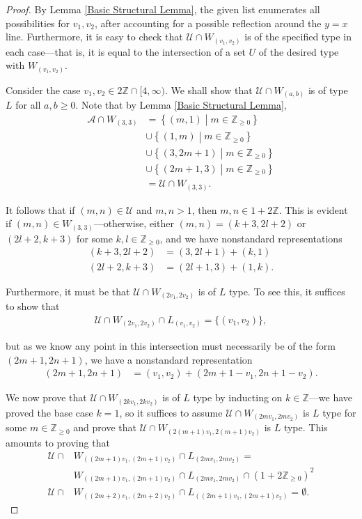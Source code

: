 \documentclass{amsart}
\newcommand{\ZZ}{\mathbb{Z}}
\newcommand{\U}{\mathcal{U}}
\newcommand{\A}{\mathcal{A}}
\theoremstyle{theorem}
\theoremstyle{definition}
\begin{document}
\begin{proof}
By Lemma \ref{Basic Structural Lemma}, the given list enumerates all possibilities for $v_1, v_2$, after accounting for a possible reflection around the $y = x$ line. Furthermore, it is easy to check that $\U \cap W_{(v_1, v_2)}$ is of the specified type in each case---that is, it is equal to the intersection of a set $U$ of the desired type with $W_{(v_1, v_2)}$.

Consider the case $v_1, v_2 \in 2\ZZ \cap [4,\infty)$. We shall show that $\U \cap W_{(a, b)}$ is of type $L$ for all $a,b \geq 0$. Note that by Lemma \ref{Basic Structural Lemma},
\begin{align*}
\A \cap W_{(3, 3)} &= \left\{(m,1) \middle| m \in \ZZ_{\geq 0}\right\} \\
&\cup \left\{(1,m) \middle| m \in \ZZ_{\geq 0}\right\} \\
&\cup \left\{(3,2m + 1) \middle| m \in \ZZ_{\geq 0} \right\} \\
&\cup \left\{(2m + 1,3) \middle| m \in \ZZ_{\geq 0} \right\} \\ &= \U \cap W_{(3, 3)}.
\end{align*}

\noindent It follows that if $(m,n) \in \U$ and $m, n > 1$, then $m, n \in 1 + 2\ZZ$. This is evident if $(m,n) \in W_{(3, 3)}$---otherwise, either $(m,n) = (k + 3, 2l + 2)$ or $(2l + 2, k + 3)$ for some $k, l \in \ZZ_{\geq 0}$, and we have nonstandard representations
	\begin{align*}
   (k + 3, 2l + 2) &= (3, 2l + 1) + (k, 1) \\
   (2l + 2, k + 3) &= (2l + 1, 3) + (1,k).
    \end{align*}
    
\noindent Furthermore, it must be that $\U \cap W_{(2v_1, 2v_2)}$ is of $L$ type. To see this, it suffices to show that
	\begin{align*}
    \U \cap W_{(2v_1, 2v_2)} \cap L_{(v_1, v_2)} = \{(v_1, v_2)\},
    \end{align*}
    
\noindent but as we know any point in this intersection must necessarily be of the form $(2m + 1, 2n + 1)$, we have a nonstandard representation 
	\begin{align*}
	(2m + 1, 2n + 1) &= (v_1, v_2) + (2m + 1 - v_1, 2n + 1 - v_2).
	\end{align*}
    
\noindent We now prove that $\U \cap W_{(2kv_1, 2kv_2)}$ is of $L$ type by inducting on $k \in \ZZ$---we have proved the base case $k = 1$, so it suffices to assume $\U \cap W_{(2mv_1, 2mv_2)}$ is $L$ type for some $m \in \ZZ_{\geq 0}$ and prove that $\U \cap W_{(2(m + 1)v_1, 2(m + 1)v_2)}$ is $L$ type. This amounts to proving that
	\begin{align*}
    \U \cap &W_{\left((2m + 1)v_1, (2m + 1)v_2\right)} \cap L_{(2mv_1, 2mv_2)} = \\ &W_{\left((2m + 1)v_1, (2m + 1)v_2\right)} \cap L_{(2mv_1, 2mv_2)} \cap \left(1 + 2\ZZ_{\geq 0}\right)^2 \\
    \U \cap &W_{\left((2m + 2)v_1, (2m + 2)v_2\right)} \cap L_{\left((2m + 1)v_1, (2m + 1)v_2\right)} = \emptyset.
    \end{align*}
    

\end{proof}
\end{document}
